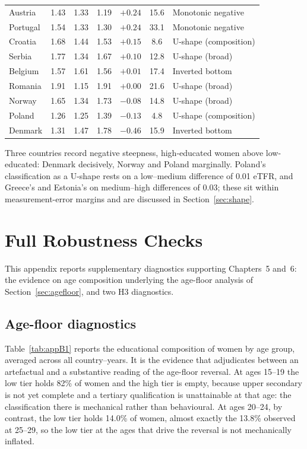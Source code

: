 \documentclass[12pt,a4paper]{report}
\begin{document}
\begin{table}[ht]
\begin{tabular}{@{}lcccccl@{}}
Austria         & 1.43 & 1.33 & 1.19 & $+0.24$ & 15.6 & Monotonic negative \\
Portugal        & 1.54 & 1.33 & 1.30 & $+0.24$ & 33.1 & Monotonic negative \\
Croatia         & 1.68 & 1.44 & 1.53 & $+0.15$ & 8.6  & U-shape (composition) \\
Serbia          & 1.77 & 1.34 & 1.67 & $+0.10$ & 12.8 & U-shape (broad) \\
Belgium         & 1.57 & 1.61 & 1.56 & $+0.01$ & 17.4 & Inverted bottom \\
Romania         & 1.91 & 1.15 & 1.91 & $+0.00$ & 21.6 & U-shape (broad) \\
Norway          & 1.65 & 1.34 & 1.73 & $-0.08$ & 14.8 & U-shape (broad) \\
Poland          & 1.26 & 1.25 & 1.39 & $-0.13$ & 4.8  & U-shape (composition) \\
Denmark         & 1.31 & 1.47 & 1.78 & $-0.46$ & 15.9 & Inverted bottom \\
\bottomrule
\end{tabular}
\end{table}

\noindent Three countries record negative steepness, high-educated women above low-educated:
Denmark decisively, Norway and Poland marginally. Poland's classification as a U-shape
rests on a low--medium difference of 0.01 eTFR, and Greece's and Estonia's on medium--high
differences of 0.03; these sit within measurement-error margins and are discussed in
Section~\ref{sec:shape}.

\chapter{Full Robustness Checks}

This appendix reports supplementary diagnostics supporting Chapters~5 and~6: the evidence on age
composition underlying the age-floor analysis of Section~\ref{sec:agefloor}, and two H3 diagnostics.

\section*{Age-floor diagnostics}

Table~\ref{tab:appB1} reports the educational composition of women by age group, averaged across all
country--years. It is the evidence that adjudicates between an artefactual and a substantive reading
of the age-floor reversal. At ages 15--19 the low tier holds 82\% of women and the high tier is
empty, because upper secondary is not yet complete and a tertiary qualification is unattainable at
that age: the classification there is mechanical rather than behavioural. At ages 20--24, by
contrast, the low tier holds 14.0\% of women, almost exactly the 13.8\% observed at 25--29, so the
low tier at the ages that drive the reversal is not mechanically inflated.
\end{document}
